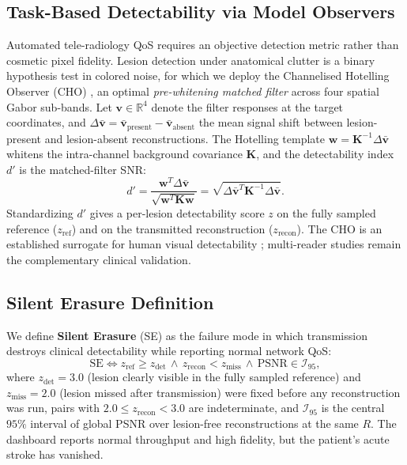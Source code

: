 \documentclass[conference]{IEEEtran}
\begin{document}
\subsection{Task-Based Detectability via Model Observers}
Automated tele-radiology QoS requires an objective detection metric rather than cosmetic pixel fidelity. Lesion detection under anatomical clutter is a binary hypothesis test in colored noise, for which we deploy the Channelised Hotelling Observer (CHO) \cite{barrett1993model}, an optimal \emph{pre-whitening matched filter} across four spatial Gabor sub-bands. Let $\mathbf{v} \in \mathbb{R}^4$ denote the filter responses at the target coordinates, and $\Delta\bar{\mathbf{v}} = \bar{\mathbf{v}}_{\text{present}} - \bar{\mathbf{v}}_{\text{absent}}$ the mean signal shift between lesion-present and lesion-absent reconstructions. The Hotelling template $\mathbf{w} = \mathbf{K}^{-1}\Delta\bar{\mathbf{v}}$ whitens the intra-channel background covariance $\mathbf{K}$, and the detectability index $d'$ is the matched-filter SNR:
\begin{equation}
d' = \frac{\mathbf{w}^T \Delta\bar{\mathbf{v}}}{\sqrt{\mathbf{w}^T \mathbf{K} \mathbf{w}}} = \sqrt{\Delta\bar{\mathbf{v}}^T \mathbf{K}^{-1} \Delta\bar{\mathbf{v}}} .
\label{eq:dprime}
\end{equation}
Standardizing $d'$ gives a per-lesion detectability score $z$ on the fully sampled reference ($z_{\text{ref}}$) and on the transmitted reconstruction ($z_{\text{recon}}$). The CHO is an established surrogate for human visual detectability \cite{barrett1993model}; multi-reader studies remain the complementary clinical validation.

\subsection{Silent Erasure Definition}
We define \textbf{Silent Erasure} (SE) as the failure mode in which transmission destroys clinical detectability while reporting normal network QoS:
\begin{equation}
\text{SE} \iff z_{\text{ref}} \ge z_{\text{det}} \,\wedge\, z_{\text{recon}} < z_{\text{miss}} \,\wedge\, \text{PSNR} \in \mathcal{I}_{95},
\label{eq:silent_erasure}
\end{equation}
where $z_{\text{det}} = 3.0$ (lesion clearly visible in the fully sampled reference) and $z_{\text{miss}} = 2.0$ (lesion missed after transmission) were fixed before any reconstruction was run, pairs with $2.0 \le z_{\text{recon}} < 3.0$ are indeterminate, and $\mathcal{I}_{95}$ is the central $95\%$ interval of global PSNR over lesion-free reconstructions at the same $R$. The dashboard reports normal throughput and high fidelity, but the patient's acute stroke has vanished.
\end{document}
